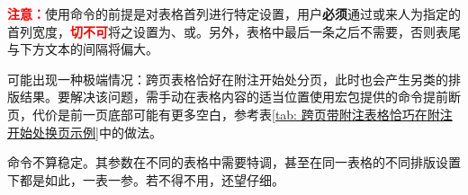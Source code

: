 \documentclass[QingNianC, vlined, timesmathnogreek]{nsfc}
\begin{document}
	\textcolor{red}{\textbf{注意：}}使用命令的前提是对表格首列进行特定设置，用户\textbf{必须}通过或来人为指定的首列宽度，\textcolor{red}{\textbf{切不可}}将之设置为、或。另外，表格中最后一条之后不需要\shadcmd{\shadcmd{}}，否则表尾与下方文本的间隔将偏大。

	可能出现一种极端情况：跨页表格恰好在附注开始处分页，此时也会产生另类的排版结果。要解决该问题，需手动在表格内容的适当位置使用\href{https://mirrors.tuna.tsinghua.edu.cn/CTAN/macros/latex/required/tools/longtable.pdf}{\ttfamily\color{DarkRed}}宏包提供的命令提前断页，代价是前一页底部可能有更多空白，参考表\ref{tab: 跨页带附注表格恰巧在附注开始处换页示例}中的做法。

	命令不算稳定。其参数在不同的表格中需要特调，甚至在同一表格的不同排版设置下都是如此，一表一参。若不得不用，还望仔细。


	\newpage
\end{document}
